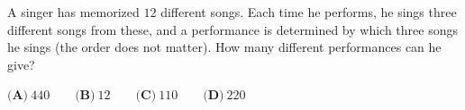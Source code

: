 A singer has memorized $12$ different songs. Each time he performs, he sings three different songs from these, and a performance is determined by which three songs he sings (the order does not matter). How many different performances can he give?

$\textbf{(A)}\ 440\qquad\textbf{(B)}\ 12\qquad\textbf{(C)}\ 110\qquad\textbf{(D)}\ 220$
